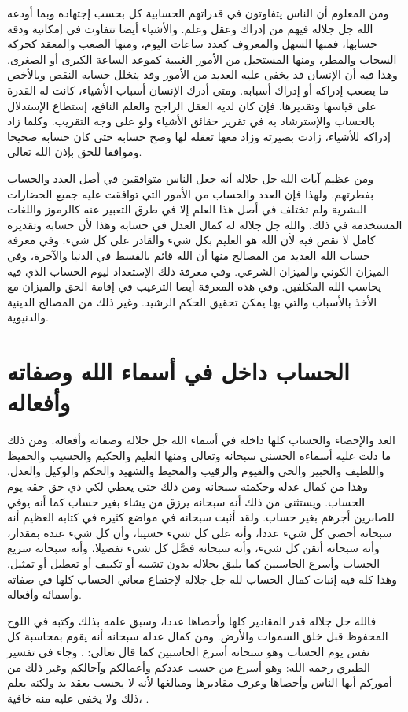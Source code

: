 ومن المعلوم أن الناس يتفاوتون في قدراتهم الحسابية كل بحسب إجتهاده وبما أودعه الله جل جلاله فيهم من إدراك وعقل وعلم. والأشياء أيضا تتفاوت في إمكانية ودقة حسابها، فمنها السهل والمعروف كعدد ساعات اليوم، ومنها الصعب والمعقد كحركة السحاب والمطر، ومنها المستحيل من الأمور الغيبية كموعد الساعة الكبرى أو الصغرى. وهذا فيه أن الإنسان قد يخفى عليه العديد من الأمور وقد يتخلل حسابه النقص وبالأخص ما يصعب إدراكه أو إدراك أسبابه. ومتى أدرك الإنسان أسباب الأشياء، كانت له القدرة على قياسها وتقديرها. فإن كان لديه العقل الراجح والعلم النافع، إستطاع الإستدلال بالحساب والإسترشاد به في تقرير حقائق الأشياء ولو على وجه التقريب. وكلما زاد إدراكه للأشياء، زادت بصيرته وزاد معها تعقله لها وصح حسابه حتى كان حسابه صحيحا وموافقا للحق بإذن الله تعالى.

ومن عظيم آيات الله جل جلاله أنه جعل الناس متوافقين في أصل العدد والحساب بفطرتهم. ولهذا فإن العدد والحساب من الأمور التي توافقت عليه جميع الحضارات البشرية ولم تختلف في أصل هذا العلم إلا في طرق التعبير عنه كالرموز واللغات المستخدمة في ذلك. والله جل جلاله له كمال العدل في حسابه وهذا لأن حسابه وتقديره كامل لا نقص فيه لأن الله هو العليم بكل شيء والقادر على كل شيء. وفي معرفة حساب الله العديد من المصالح منها أن الله قائم بالقسط في الدنيا والآخرة، وفي الميزان الكوني والميزان الشرعي. وفي معرفة ذلك الإستعداد ليوم الحساب الذي فيه يحاسب الله المكلفين. وفي هذه المعرفة أيضا الترغيب في إقامة الحق والميزان مع الأخذ بالأسباب والتي بها يمكن تحقيق الحكم الرشيد. وغير ذلك من المصالح الدينية والدنيوية.

\section{الحساب داخل في أسماء الله وصفاته وأفعاله}

العد والإحصاء والحساب كلها داخلة في أسماء الله جل جلاله وصفاته وأفعاله. ومن ذلك ما دلت عليه أسماءه الحسنى سبحانه وتعالى ومنها العليم والحكيم والحسيب والحفيظ واللطيف والخبير والحي والقيوم والرقيب والمحيط والشهيد والحكم والوكيل والعدل. وهذا من كمال عدله وحكمته سبحانه ومن ذلك حتى يعطي لكي ذي حق حقه يوم الحساب. ويستثنى من ذلك أنه سبحانه يرزق من يشاء بغير حساب كما أنه يوفي للصابرين أجرهم بغير حساب. ولقد أثبت سبحانه في مواضع كثيره في كتابه العظيم أنه سبحانه أحصى كل شيء عددا، وأنه على كل شيء حسيبا، وأن كل شيء عنده بمقدار، وأنه سبحانه أتقن كل شيء، وأنه سبحانه فصَّل كل شيء تفصيلا، وأنه سبحانه سريع الحساب وأسرع الحاسبين كما يليق بجلاله بدون تشبيه أو تكييف أو تعطيل أو تمثيل. وهذا كله فيه إثبات كمال الحساب لله جل جلاله لإجتماع معاني الحساب كلها في صفاته وأسمائه وأفعاله.

فالله جل جلاله قدر المقادير كلها وأحصاها عددا، وسبق علمه بذلك وكتبه في اللوح المحفوظ قبل خلق السموات والأرض. ومن كمال عدله سبحانه أنه يقوم بمحاسبة كل نفس يوم الحساب وهو سبحانه أسرع الحاسبين كما قال تعالى: \quranayah*[6][62]{\footnotesize \surahname*[6]}. وجاء في تفسير الطبري رحمه الله: وهو أسرع من حسب عددكم وأعمالكم وآجالكم وغير ذلك من أموركم أيها الناس وأحصاها وعرف مقاديرها ومبالغها لأنه لا يحسب بعقد يد ولكنه يعلم ذلك ولا يخفى عليه منه خافية، \quranayah*[34][3][13]{\footnotesize \surahname*[34]} \href{https://shamela.ws/book/7798/6327#p1}{\faExternalLink} \cite{tafsir_Tabari}.

